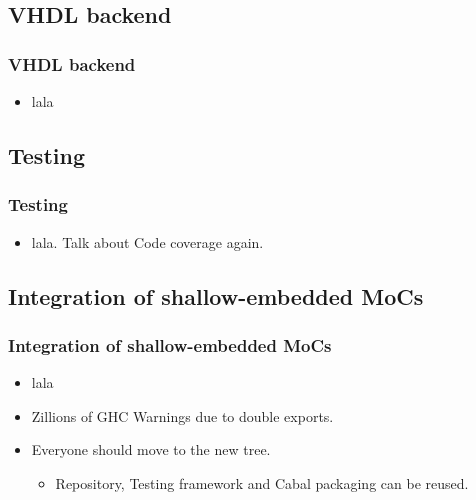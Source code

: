 \documentclass{beamer}
\begin{document}
\subsection{VHDL backend}

\begin{frame}[fragile]
  \frametitle{VHDL backend}
  \begin{itemize}
  \item lala
  \end{itemize}
  
\end{frame}

\subsection{Testing}

\begin{frame}
  \frametitle{Testing}
  \begin{itemize}
  \item lala. Talk about Code coverage again.
  \end{itemize}
  
\end{frame}

\subsection{Integration of shallow-embedded MoCs}

\begin{frame}
  \frametitle{Integration of shallow-embedded MoCs}
  \begin{itemize}
  \item lala
  \item \alert{Zillions of GHC Warnings} due to double exports.
  \item Everyone should move to the new tree.
    \begin{itemize}
    \item Repository, Testing framework and Cabal packaging can be reused.
    \end{itemize}
  \end{itemize}
  
\end{frame}
\end{document}
